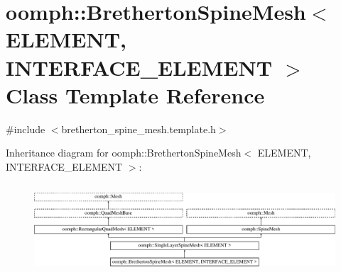 \hypertarget{classoomph_1_1BrethertonSpineMesh}{}\section{oomph\+:\+:Bretherton\+Spine\+Mesh$<$ E\+L\+E\+M\+E\+NT, I\+N\+T\+E\+R\+F\+A\+C\+E\+\_\+\+E\+L\+E\+M\+E\+NT $>$ Class Template Reference}
\label{classoomph_1_1BrethertonSpineMesh}


{\ttfamily \#include $<$bretherton\+\_\+spine\+\_\+mesh.\+template.\+h$>$}

Inheritance diagram for oomph\+:\+:Bretherton\+Spine\+Mesh$<$ E\+L\+E\+M\+E\+NT, I\+N\+T\+E\+R\+F\+A\+C\+E\+\_\+\+E\+L\+E\+M\+E\+NT $>$\+:\begin{figure}[H]
\begin{center}
\leavevmode
\includegraphics[height=3.414634cm]{classoomph_1_1BrethertonSpineMesh}
\end{center}
\end{figure}
